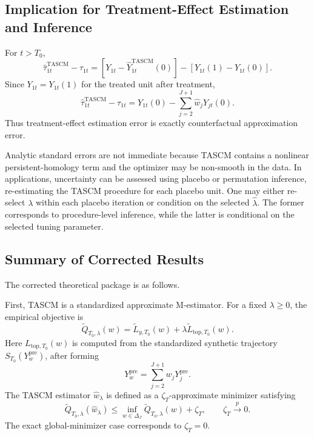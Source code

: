 \documentclass[11pt]{article}
\theoremstyle{plain}
\theoremstyle{definition}
\theoremstyle{remark}
\newcommand{\1}{\mathbbm{1}}
\newcommand{\TASCM}{\mathrm{TASCM}}
\newcommand{\pre}{\mathrm{pre}}
\newcommand{\pto}{\xrightarrow{p}}
\begin{document}
\subsection{Implication for Treatment-Effect Estimation and Inference}

For \(t>T_0\),
\[
\widehat\tau_{1t}^{\TASCM}-\tau_{1t}
=
\left[
Y_{1t}-\widehat Y_{1t}^{\TASCM}(0)
\right]
-
\left[
Y_{1t}(1)-Y_{1t}(0)
\right].
\]
Since \(Y_{1t}=Y_{1t}(1)\) for the treated unit after treatment,
\[
\widehat\tau_{1t}^{\TASCM}-\tau_{1t}
=
Y_{1t}(0)
-
\sum_{j=2}^{J+1}\widehat w_jY_{jt}(0).
\]
Thus treatment-effect estimation error is exactly counterfactual approximation
error.

Analytic standard errors are not immediate because TASCM contains a nonlinear
persistent-homology term and the optimizer may be non-smooth in the data. In
applications, uncertainty can be assessed using placebo or permutation
inference, re-estimating the TASCM procedure for each placebo unit. One may
either re-select \(\lambda\) within each placebo iteration or condition on the
selected \(\widehat\lambda\). The former corresponds to procedure-level
inference, while the latter is conditional on the selected tuning parameter.

\subsection{Summary of Corrected Results}

The corrected theoretical package is as follows.

First, TASCM is a standardized approximate M-estimator. For a fixed
\(\lambda\ge0\), the empirical objective is
\[
\widetilde Q_{T_0,\lambda}(w)
=
\widetilde L_{y,T_0}(w)
+
\lambda
\widetilde L_{\mathrm{top},T_0}(w).
\]
Here \(L_{\mathrm{top},T_0}(w)\) is computed from the standardized synthetic
trajectory \(S_{T_0}(Y_w^{\pre})\), after forming
\[
Y_w^{\pre}
=
\sum_{j=2}^{J+1}w_jY_j^{\pre}.
\]
The TASCM estimator \(\widehat w_\lambda\) is defined as a
\(\zeta_T\)-approximate minimizer satisfying
\[
\widetilde Q_{T_0,\lambda}(\widehat w_\lambda)
\le
\inf_{w\in\Delta_J}
\widetilde Q_{T_0,\lambda}(w)
+
\zeta_T,
\qquad
\zeta_T\pto0.
\]
The exact global-minimizer case corresponds to \(\zeta_T=0\).
\end{document}
